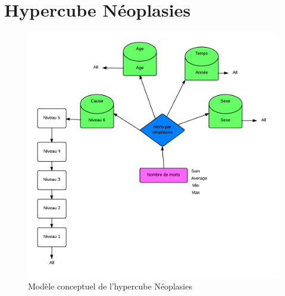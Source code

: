 \section{Hypercube Néoplasies}
\begin{figure}[h]
    \centering
    \includegraphics[width=\linewidth]{images/cubeNeo.png}
    \caption{Modèle conceptuel de l'hypercube Néoplasies}
    \label{conception_cube_néoplasies}
\end{figure}

\pagebreak

